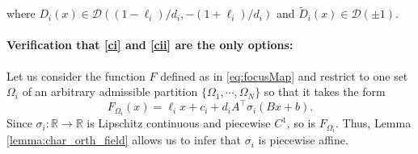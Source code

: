\documentclass{article}
\theoremstyle{plain}
\theoremstyle{definition}
\theoremstyle{definition}
\theoremstyle{remark}
\theoremstyle{definition}
\theoremstyle{definition}
\theoremstyle{remark}
\numberwithin{equation}{section}
\begin{document}
where $D_i(x)\in \mathcal{D}((1-\ell_i)/d_i, -(1+\ell_i)/d_i)$ and $\widetilde{D}_i(x)\in \mathcal{D}(\pm 1)$.

\paragraph{Verification that \ref{ci} and \ref{cii} are the only options:}

Let us consider the function $F$ defined as in \eqref{eq:focusMap} and restrict to one set $\Omega_i$ of an arbitrary admissible partition $\{\Omega_1,\cdots,\Omega_N\}$ so that it takes the form
\begin{equation}\label{eq:ithPiece}
F_{\Omega_i}(x) = \ell_i x + c_i + d_i A^\top \sigma_i(Bx+b).
\end{equation}
Since $\sigma_i:\mathbb{R}\to\mathbb{R}$ is Lipschitz continuous and piecewise $C^1$, so is $F_{\Omega_i}$. Thus, Lemma \ref{lemma:char_orth_field} allows us to infer that $\sigma_i$ is piecewise affine. 
\end{document}
